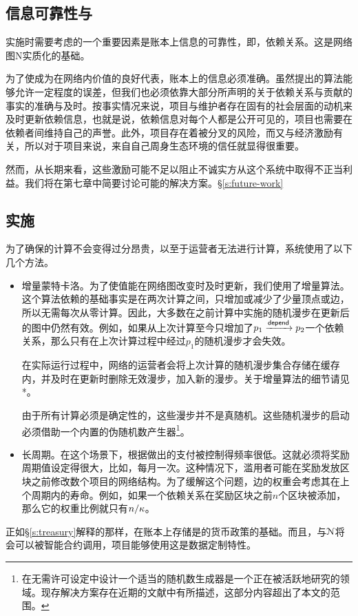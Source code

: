 \subsection{信息可靠性与\osrank{}}

实施\osrank{}时需要考虑的一个重要因素是账本上信息的可靠性，即，依赖关系。这是网络图N实质化的基础。

为了使\osrank{}成为在网络内价值的良好代表，账本上的信息必须准确。虽然提出的算法能够允许一定程度的误差，但我们也必须依靠大部分所声明的关于依赖关系与贡献的事实的准确与及时。按事实情况来说，项目与维护者存在固有的社会层面的动机来及时更新依赖信息，也就是说，依赖信息对每个人都是公开可见的，项目也需要在依赖者间维持自己的声誉。此外，项目存在着被分叉的风险，而\osrank{}又与经济激励有关，所以对于项目来说，来自自己周身生态环境的信任就显得很重要。

然而，从长期来看，这些激励可能不足以阻止不诚实方从这个系统中取得不正当利益。我们将在第七章中简要讨论可能的解决方案。\S\ref{s:future-work}

\subsection{实施}

为了确保\osrank{}的计算不会变得过分昂贵，以至于运营者无法进行计算，系统使用了以下几个方法。

\begin{itemize}
\item 增量蒙特卡洛。为了使\osrank{}值能在网络图改变时及时更新，我们使用了增量算法。这个算法依赖的基础事实是在两次计算之间，只增加或减少了少量顶点或边，所以无需每次从零计算\osrank{}。因此，大多数在之前计算中实施的随机漫步在更新后的图中仍然有效。例如，如果从上次计算至今只增加了$p_1 \xrightarrow[]{\mathsf{depend}} p_2$一个依赖关系，那么只有在上次计算过程中经过$p_1$的随机漫步才会失效。

    在实际运行过程中，网络的运营者会将上次计算的随机漫步集合存储在缓存内，并及时在更新时删除无效漫步，加入新的漫步。关于增量\pagerank{}算法的细节请见*。\cite{incr pagerank}

    由于所有计算必须是确定性的，这些漫步并不是真随机。这些随机漫步的启动必须借助一个内置的伪随机数产生器\footnote{在无需许可设定中设计一个适当的随机数生成器是一个正在被活跃地研究的领域。现存解决方案存在近期的文献中有所描述，这部分内容超出了本文的范围。}。

\item 长周期。在这个场景下，根据\osrank{}做出的支付被控制得频率很低。这就必须将奖励周期值设定得很大，比如，每月一次。这种情况下，滥用者可能在奖励发放区块之前修改数个项目的网络结构。为了缓解这个问题，边的权重会考虑其在上个周期内的寿命。例如，如果一个依赖关系在奖励区块之前$n$个区块被添加，那么它的权重比例就只有$n/\kappa$。\end{itemize}

\bigskip

\noindent 正如\S \ref{s:treasury}解释的那样，在账本上存储\osrank{}是\oscoin{}的货币政策的基础。而且，\osrank{}与$\mathcal{N}$将会可以被智能合约调用，项目能够使用这是数据定制特性。